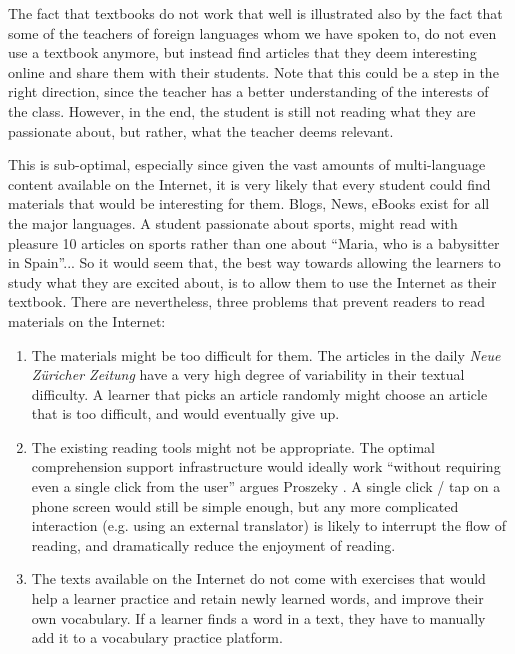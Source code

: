 

The fact that textbooks do not work that well is illustrated also by the fact that some of the teachers of foreign languages whom we have spoken to, do not even use a textbook anymore, but instead find articles that they deem interesting online and share them with their students. Note that this could be a step in the right direction, since the teacher has a better understanding of the interests of the class. However, in the end, the student is still not reading what they are passionate about, but rather, what the teacher deems relevant. 

This is sub-optimal, especially since given the vast amounts of multi-language content available on the Internet, it is very likely that every student could find materials that would be interesting for them. Blogs, News, eBooks exist for all the major languages. A student passionate about sports, might read with pleasure 10 articles on sports rather than one about ``Maria, who is a babysitter in Spain''... So it would seem that, the best way towards allowing the learners to study what they are excited about, is to allow them to use the Internet as their textbook. There are nevertheless, three problems that prevent readers to read materials on the Internet:

\begin{enumerate}
	
  \item The materials might be too difficult for them. The articles in the  daily {\em Neue Z\"uricher Zeitung} have a very high degree of variability in their textual difficulty. A learner that picks an article randomly might choose an article that is too difficult, and would eventually give up. 

  \item The existing reading tools might not be appropriate. The optimal comprehension support infrastructure would ideally work ``without requiring even a single click from the user'' argues Proszeky \cite{Proszeky02-Comprehension}. A single click / tap on a phone screen would still be simple enough, but any more complicated interaction (e.g. using an external translator) is likely to interrupt the flow of reading, and dramatically reduce the enjoyment of reading. 
  
  \item The texts available on the Internet do not come with exercises that would help a learner practice and retain newly learned words, and improve their own vocabulary. If a learner finds a word in a text, they have to manually add it to a vocabulary practice platform. 
  
\end{enumerate}

